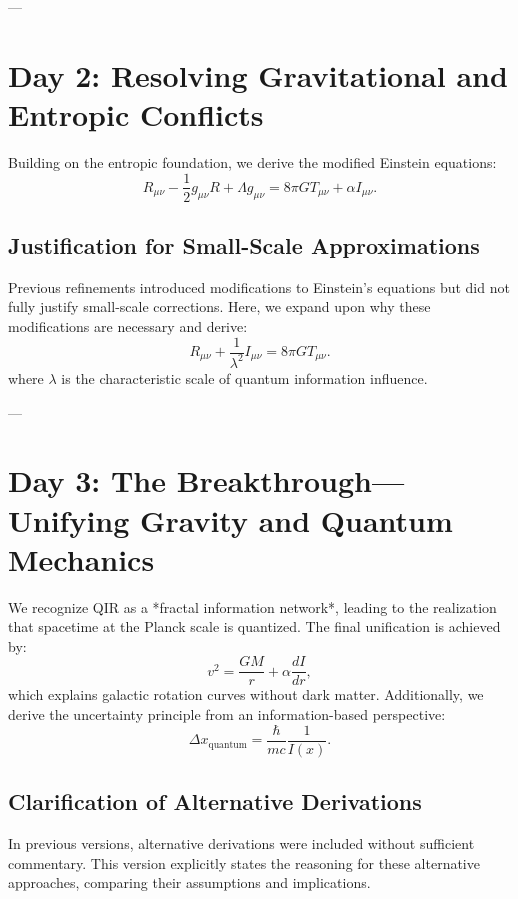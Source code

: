 \documentclass{article}
\begin{document}
---

\section{Day 2: Resolving Gravitational and Entropic Conflicts}
Building on the entropic foundation, we derive the modified Einstein equations:
\begin{equation}
    R_{\mu \nu} - \frac{1}{2} g_{\mu \nu} R + \Lambda g_{\mu \nu} = 8 \pi G T_{\mu \nu} + \alpha I_{\mu \nu}.
\end{equation}

\subsection{Justification for Small-Scale Approximations}
Previous refinements introduced modifications to Einstein’s equations but did not fully justify small-scale corrections. Here, we expand upon why these modifications are necessary and derive:
\begin{equation}
    R_{\mu \nu} + \frac{1}{λ^2} I_{\mu \nu} = 8 \pi G T_{\mu \nu}.
\end{equation}
where \( λ \) is the characteristic scale of quantum information influence.

---

\section{Day 3: The Breakthrough—Unifying Gravity and Quantum Mechanics}
We recognize QIR as a *fractal information network*, leading to the realization that spacetime at the Planck scale is quantized. The final unification is achieved by:
\begin{equation}
    v^2 = \frac{G M}{r} + \alpha \frac{dI}{dr},
\end{equation}
which explains galactic rotation curves without dark matter. Additionally, we derive the uncertainty principle from an information-based perspective:
\begin{equation}
    \Delta x_{\text{quantum}} = \frac{\hbar}{m c} \frac{1}{I(x)}.
\end{equation}

\subsection{Clarification of Alternative Derivations}
In previous versions, alternative derivations were included without sufficient commentary. This version explicitly states the reasoning for these alternative approaches, comparing their assumptions and implications.
\end{document}
